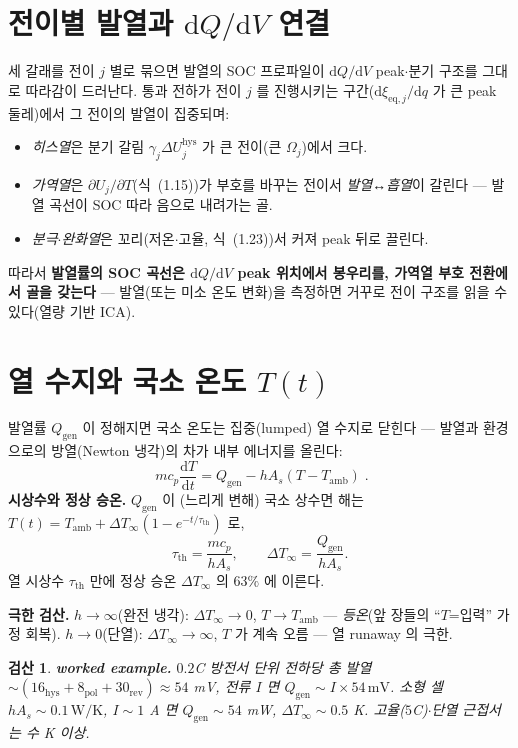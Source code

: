 \documentclass[11pt,a4paper]{article}
\newtheorem*{verifybox}{검산}
\newcommand{\dd}{\mathrm{d}}
\newcommand{\eq}{\mathrm{eq}}
\newcommand{\hys}{\mathrm{hys}}
\newcommand{\pol}{\mathrm{pol}}
\newcommand{\rev}{\mathrm{rev}}
\newcommand{\gen}{\mathrm{gen}}
\newcommand{\amb}{\mathrm{amb}}
\newcommand{\Th}{\mathrm{th}}
\begin{document}
\section{전이별 발열과 $\dd Q/\dd V$ 연결}\label{sec:h_perpeak}
세 갈래를 전이 $j$ 별로 묶으면 발열의 SOC 프로파일이 $\dd Q/\dd V$ peak$\cdot$분기 구조를 그대로 따라감이
드러난다. 통과 전하가 전이 $j$ 를 진행시키는 구간($\dd\xi_{\eq,j}/\dd q$ 가 큰 peak 둘레)에서 그 전이의 발열이
집중되며:
\begin{itemize}[leftmargin=1.4em,itemsep=2pt]
\item \emph{히스열}은 분기 갈림 $\gamma_j\Delta U_j^\hys$ 가 큰 전이(큰 $\Omega_j$)에서 크다.
\item \emph{가역열}은 $\partial U_j/\partial T$(식~(1.15))가 부호를 바꾸는 전이서 \emph{발열↔흡열}이 갈린다 — 발열
  곡선이 SOC 따라 음으로 내려가는 골.
\item \emph{분극$\cdot$완화열}은 꼬리(저온$\cdot$고율, 식~(1.23))서 커져 peak 뒤로 끌린다.
\end{itemize}
따라서 \textbf{발열률의 SOC 곡선은 $\dd Q/\dd V$ peak 위치에서 봉우리를, 가역열 부호 전환에서 골을 갖는다} —
발열(또는 미소 온도 변화)을 측정하면 거꾸로 전이 구조를 읽을 수 있다(열량 기반 ICA).

\section{열 수지와 국소 온도 $T(t)$}\label{sec:h_balance}
발열률 $Q_\gen$ 이 정해지면 국소 온도는 집중(lumped) 열 수지로 닫힌다 — 발열과 환경으로의 방열(Newton 냉각)의
차가 내부 에너지를 올린다:
\begin{equation}
\boxed{\;m c_p\frac{\dd T}{\dd t}=Q_\gen-hA_s(T-T_\amb)\;.}
\label{eq:h_balance}
\end{equation}
\textbf{시상수와 정상 승온.} $Q_\gen$ 이 (느리게 변해) 국소 상수면 해는 $T(t)=T_\amb+\Delta T_\infty(1-e^{-t/\tau_\Th})$ 로,
\begin{equation}
\tau_\Th=\frac{mc_p}{hA_s},\qquad \Delta T_\infty=\frac{Q_\gen}{hA_s}.
\label{eq:h_tau}
\end{equation}
열 시상수 $\tau_\Th$ 만에 정상 승온 $\Delta T_\infty$ 의 $63\%$ 에 이른다.

\textbf{극한 검산.} $h\to\infty$(완전 냉각): $\Delta T_\infty\to0$, $T\to T_\amb$ — \emph{등온}(앞 장들의
``$T$=입력'' 가정 회복). $h\to0$(단열): $\Delta T_\infty\to\infty$, $T$ 가 계속 오름 — 열 runaway 의 극한.
\begin{verifybox}
\textbf{worked example.} $0.2$C 방전서 단위 전하당 총 발열 $\sim(16_\hys+8_\pol+30_\rev)\approx54$ mV, 전류 $I$ 면
$Q_\gen\sim I\times54\,\mathrm{mV}$. 소형 셀 $hA_s\sim0.1\,\mathrm{W/K}$, $I\sim1$ A 면 $Q_\gen\sim54$ mW,
$\Delta T_\infty\sim0.5$ K. 고율($5$C)$\cdot$단열 근접서는 수 K 이상.
\end{verifybox}
\end{document}

